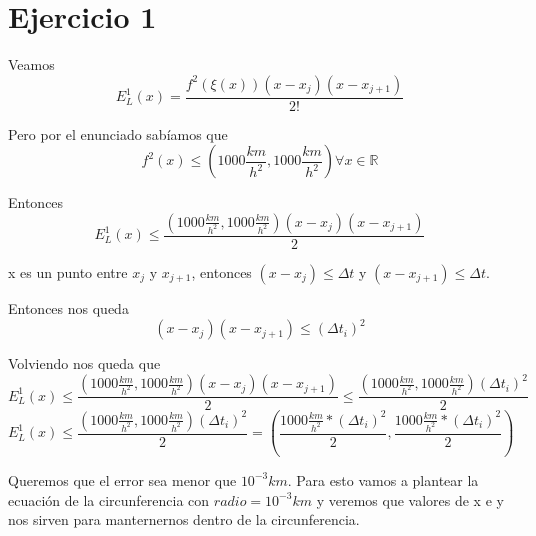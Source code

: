 \documentclass[a4paper,10pt]{article}
\begin{document}
\section{Ejercicio 1}
\par Veamos
\begin{equation}
	E_L^1(x) =  \frac{f^2(\xi(x))(x - x_j)(x - x_{j+1})}{2!}
\end{equation}
\par Pero por el enunciado sabíamos que
\begin{equation}
	f^2(x) \leq (1000 \frac{km}{h^2}, 1000 \frac{km}{h^2}) \forall x \in \mathds{R}
\end{equation}
\par Entonces
\begin{equation}
	E_L^1(x) \leq \frac{(1000 \frac{km}{h^2}, 1000 \frac{km}{h^2})(x - x_j)(x - x_{j+1})}{2}
\end{equation}
\par x es un punto entre $x_j$ y $x_{j+1}$, entonces $(x - x_j) \le \Delta t$ y $(x - x_{j+1}) \le \Delta t$.
\par Entonces nos queda
\begin{equation}
	(x - x_j)(x - x_{j+1}) \leq (\Delta t_i)^2
\end{equation}
\par Volviendo nos queda que
\begin{equation}
	E_L^1(x) \leq \frac{(1000 \frac{km}{h^2}, 1000 \frac{km}{h^2})(x - x_j)(x - x_{j+1})}{2} \leq \frac{(1000 \frac{km}{h^2}, 1000 \frac{km}{h^2})(\Delta t_i)^2}{2}
\end{equation}
\begin{equation}
	E_L^1(x) \leq \frac{(1000 \frac{km}{h^2}, 1000 \frac{km}{h^2})(\Delta t_i)^2}{2}  = (\frac{1000 \frac{km}{h^2} * (\Delta t_i)^2}{2}, \frac{1000 \frac{km}{h^2} * (\Delta t_i)^2}{2})
\end{equation}
\par Queremos que el error sea menor que $10^{-3}km$. Para esto vamos a plantear la ecuación de la circunferencia con $radio = 10^{-3}km$ y veremos que valores de x e y nos sirven para manternernos dentro de la circunferencia.
\end{document}
